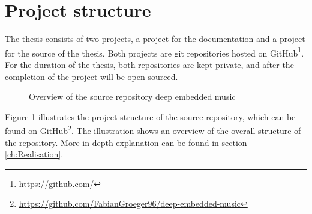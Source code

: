 \section{Project structure}
\label{sec:Project-Structure}
The thesis consists of two projects, a project for the documentation and a project for the source of the thesis. Both projects are git repositories hosted on GitHub\footnote{\url{https://github.com/}}. For the duration of the thesis, both repositories are kept private, and after the completion of the project will be open-sourced.

\begin{figure}[ht]
\caption{Overview of the source repository \flqq deep embedded music\frqq}
\label{fig:Project-Overview-Source}
\end{figure}
\noindent
Figure \ref{fig:Project-Overview-Source} illustrates the project structure of the source repository, which can be found on GitHub\footnote{\url{https://github.com/FabianGroeger96/deep-embedded-music}}. The illustration shows an overview of the overall structure of the repository. More in-depth explanation can be found in section \ref{ch:Realisation}.

